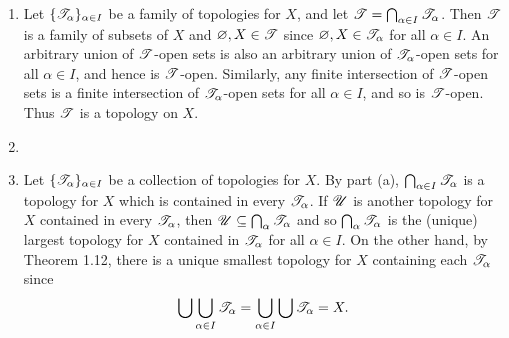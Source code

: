 \begin{prob}
\begin{enumerate}
\item Let $\{\mathscr{T}_{\alpha}\}_{\alpha \in I}$ be a family of topologies for $X$, and let $\mathscr{T} = \bigcap_{\alpha \in I}\mathscr{T}_{\alpha}$. Then $\mathscr{T}$ is a family of subsets of $X$ and $\varnothing, X \in \mathscr{T}$ since $\varnothing, X \in \mathscr{T}_{\alpha}$ for all $\alpha \in I$. An arbitrary union of $\mathscr{T}$-open sets is also an arbitrary union of $\mathscr{T}_{\alpha}$-open sets for all $\alpha \in I$, and hence is $\mathscr{T}$-open. Similarly, any finite intersection of $\mathscr{T}$-open sets is a finite intersection of $\mathscr{T}_{\alpha}$-open sets for all $\alpha \in I$, and so is $\mathscr{T}$-open. Thus $\mathscr{T}$ is a topology on $X$.

\item 

\item Let $\{\mathscr{T}_{\alpha}\}_{\alpha \in I}$ be a collection of topologies for $X$. By part (a), $\bigcap_{\alpha \in I}\mathscr{T}_{\alpha}$ is a topology for $X$ which is contained in every $\mathscr{T}_{\alpha}$. If $\mathscr{U}$ is another topology for $X$ contained in every $\mathscr{T}_{\alpha}$, then $\mathscr{U} \subseteq \bigcap_{\alpha}\mathscr{T}_{\alpha}$ and so $\bigcap_{\alpha}\mathscr{T}_{\alpha}$ is the (unique) largest topology for $X$ contained in $\mathscr{T}_{\alpha}$ for all $\alpha \in I$. On the other hand, by Theorem 1.12, there is a unique smallest topology for $X$ containing each $\mathscr{T}_{\alpha}$ since \[\bigcup\bigcup_{\alpha \in I}\mathscr{T}_{\alpha} = \bigcup_{\alpha \in I}\bigcup\mathscr{T}_{\alpha} = X.\]
\end{enumerate}
\end{prob}

